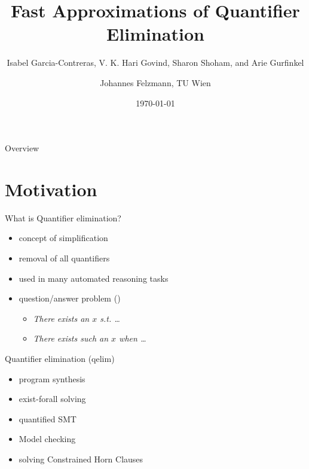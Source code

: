 \documentclass{beamer}
\title[]{Fast Approximations of Quantifier Elimination}
\subtitle{Isabel Garcia-Contreras, V. K. Hari Govind, Sharon Shoham, and Arie Gurfinkel}
\author{Johannes Felzmann, TU Wien}
\date{\today}
\begin{document}
\begin{frame}
  \titlepage
   \centering
\end{frame}


\begin{frame}{Overview}
\tableofcontents
\end{frame}
\section{Motivation}

\begin{frame}{What is Quantifier elimination?}
    \begin{itemize}
        \item concept of simplification
        \item removal of all quantifiers
        \pause
        \item used in many automated reasoning tasks
        \pause
        \item question/answer problem (\cite{QE})
        \begin{itemize}
            \item \textit{There exists an $x$ s.t. \dots}
            \item \textit{There exists such an $x$ when \dots}
        \end{itemize}
    \end{itemize}
\end{frame}



\begin{frame}{Quantifier elimination (qelim)}

\begin{itemize}
  \item program synthesis
  \item exist-forall solving
  \item quantified SMT
  \item Model checking
  \item solving Constrained Horn Clauses
\end{itemize}

\end{frame}
\end{document}
